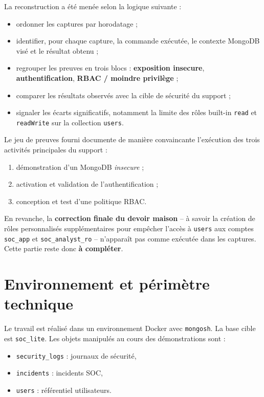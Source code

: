 \documentclass[11pt,a4paper]{article}
\begin{document}
La reconstruction a été menée selon la logique suivante :
\begin{itemize}
  \item ordonner les captures par horodatage ;
  \item identifier, pour chaque capture, la commande exécutée, le contexte MongoDB visé et le résultat obtenu ;
  \item regrouper les preuves en trois blocs : \textbf{exposition insecure}, \textbf{authentification}, \textbf{RBAC / moindre privilège} ;
  \item comparer les résultats observés avec la cible de sécurité du support ;
  \item signaler les écarts significatifs, notamment la limite des rôles built-in \texttt{read} et \texttt{readWrite} sur la collection \texttt{users}.
\end{itemize}
\newpage
\begin{summarybox}
Le jeu de preuves fourni documente de manière convaincante l'exécution des trois activités principales du support :
\begin{enumerate}
  \item démonstration d'un MongoDB \emph{insecure} ;
  \item activation et validation de l'authentification ;
  \item conception et test d'une politique RBAC.
\end{enumerate}
En revanche, la \textbf{correction finale du devoir maison} -- à savoir la création de rôles personnalisés supplémentaires pour empêcher l'accès à \texttt{users} aux comptes \texttt{soc\_app} et \texttt{soc\_analyst\_ro} -- n'apparaît pas comme exécutée dans les captures. Cette partie reste donc \textbf{à compléter}.
\end{summarybox}

\section{Environnement et périmètre technique}

Le travail est réalisé dans un environnement Docker avec \texttt{mongosh}. La base cible est \texttt{soc\_lite}. Les objets manipulés au cours des démonstrations sont :
\begin{itemize}
  \item \texttt{security\_logs} : journaux de sécurité,
  \item \texttt{incidents} : incidents SOC,
  \item \texttt{users} : référentiel utilisateurs.
\end{itemize}
\end{document}
